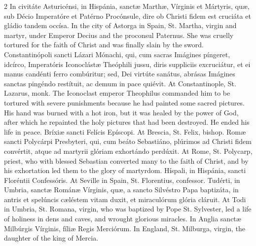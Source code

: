 \begin{paracol}{2}
In civitáte Asturicénsi, in Hispánia, sanctæ 
 Marthæ, Vírginis et Mártyris, quæ, sub Décio Imperatóre et Patérno 
 Procónsule, dire ob Christi fidem est cruciáta et gládio tandem occísa.
\switchcolumn
{}
In the city of Astorga in Spain, St. Martha, virgin and martyr, under 
 Emperor Decius and the proconsul Paternus. She was cruelly tortured 
 for the faith of Christ and was finally slain by the sword.
\switchcolumn*
{}
Constantinópoli sancti Lázari Mónachi, qui, cum 
 sacras Imágines píngeret, idcírco, Imperatóris Iconoclástæ Theóphili jussu, 
 diris suppliciis excruciátur, et ei manus candénti ferro combúritur; sed, 
 Dei virtúte sanátus, abrásas Imágines sanctas pingéndo restítuit, ac demum 
 in pace quiévit.
\switchcolumn
{}
At Constantinople, St. Lazarus, monk. The Iconoclast emperor 
 Theophilus commanded him to be tortured with severe punishments because he 
 had painted some sacred pictures. His hand was burned with a hot iron, 
 but it was healed by the power of God, after which he repainted the holy 
 pictures that had been destroyed. He ended his life in peace.
\switchcolumn*
{}
Bríxiæ sancti Felícis Epíscopi.
\switchcolumn
{}
At Brescia, St. Felix, bishop.
\switchcolumn*
{}
Romæ sancti Polycárpi Presbyteri, qui, cum 
 beáto Sebastiáno, plúrimos ad Christi fidem convértit, atque ad martyrii 
 glóriam exhortándo perdúxit.
\switchcolumn
{}
At Rome, St. Polycarp, priest, who with blessed Sebastian converted many to 
 the faith of Christ, and by his exhortation led them to the glory of 
 martyrdom.
\switchcolumn*
{}
Híspali, in Hispánia, sancti Floréntii 
 Confessóris.
\switchcolumn
{}
At Seville in Spain, St. Florentius, confessor.
\switchcolumn*
{}
Tudérti, in Umbria, sanctæ Románæ Vírginis, quæ, 
 a sancto Silvéstro Papa baptizáta, in antris et spelúncis cæléstem vitam 
 duxit, et miraculórum glória cláruit.
\switchcolumn
{}
At Todi in Umbria, St. Romana, virgin, who was baptized by Pope St. 
 Sylvester, led a life of holiness in dens and caves, and wrought glorious 
 miracles.
\switchcolumn*
{}
In Anglia sanctæ Milbúrgis Vírginis, fíliæ 
 Regis Merciórum.
\switchcolumn
{}
In England, St. Milburga, virgin, the daughter of the king of Mercia.
\switchcolumn*
{}
\end{paracol}


